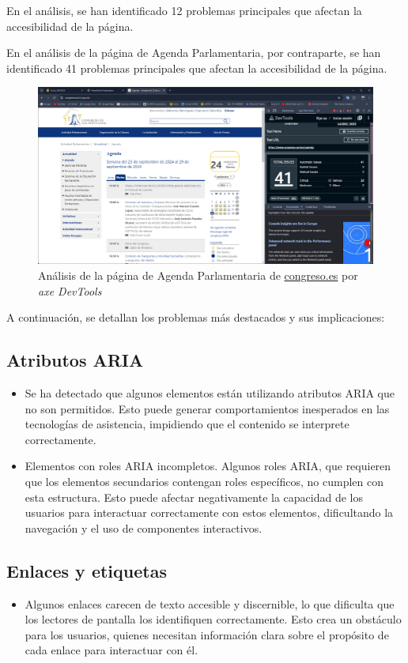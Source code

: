 \documentclass[]{article}
\begin{document}
En el análisis, se han identificado 12 problemas principales que afectan la accesibilidad de la página.

En el análisis de la página de Agenda Parlamentaria, por contraparte, se han identificado 41 problemas principales que afectan la accesibilidad de la página.

\begin{figure}[h]
	\centering
	\includegraphics[width=\textwidth]{Capturas/4.png}
	\caption{Análisis de la página de Agenda Parlamentaria de \href{https://www.congreso.es/es/home}{congreso.es} por \textit{axe DevTools}}
	\label{fig:etiqueta}
\end{figure}

A continuación, se detallan los problemas más destacados y sus implicaciones:

\subsection*{Atributos ARIA}
\begin{itemize} 
	\item Se ha detectado que algunos elementos están utilizando atributos ARIA que no son permitidos. Esto puede generar comportamientos inesperados en las tecnologías de asistencia, impidiendo que el contenido se interprete correctamente.	
	\item Elementos con roles ARIA incompletos. Algunos roles ARIA, que requieren que los elementos secundarios contengan roles específicos, no cumplen con esta estructura. Esto puede afectar negativamente la capacidad de los usuarios para interactuar correctamente con estos elementos, dificultando la navegación y el uso de componentes interactivos.
\end{itemize}

\subsection*{Enlaces y etiquetas}
\begin{itemize} 
	\item Algunos enlaces carecen de texto accesible y discernible, lo que dificulta que los lectores de pantalla los identifiquen correctamente. Esto crea un obstáculo para los usuarios, quienes necesitan información clara sobre el propósito de cada enlace para interactuar con él. 
\end{itemize}
\end{document}
